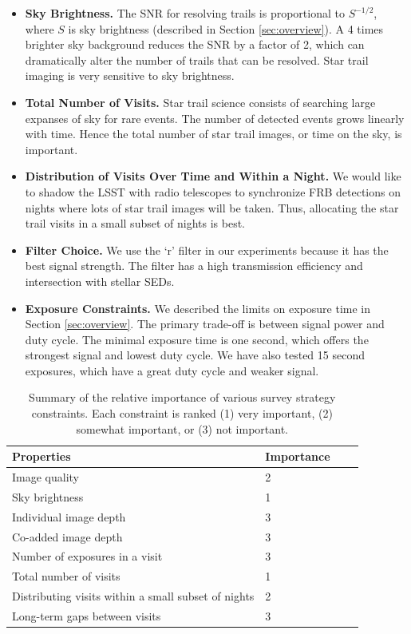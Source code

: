 \documentclass[12pt, letterpaper]{article}
\begin{document}
\begin{itemize}
\item \textbf{Sky Brightness.} The SNR for resolving trails is proportional to $S^{-1/2}$, where $S$ is sky brightness (described in Section \ref{sec:overview}). A 4 times brighter sky background reduces the SNR by a factor of 2, which can dramatically alter the number of trails that can be resolved. Star trail imaging is very sensitive to sky brightness. 

\item \textbf{Total Number of Visits.} Star trail science consists of searching large expanses of sky for rare events. The number of detected events grows linearly with time. Hence the total number of star trail images, or time on the sky, is important.

\item \textbf{Distribution of Visits Over Time and Within a Night.} We would like to shadow the LSST with radio telescopes to synchronize FRB detections on nights where lots of star trail images will be taken. Thus, allocating the star trail visits in a small subset of nights is best. 

\item \textbf{Filter Choice.} We use the `r' filter in our experiments because it has the best signal strength. The filter has a high transmission efficiency and intersection with stellar SEDs.

\item \textbf{Exposure Constraints.} We described the limits on exposure time in Section \ref{sec:overview}. The primary trade-off is between signal power and duty cycle. The minimal exposure time is one second, which offers the strongest signal and lowest duty cycle. We have also tested 15 second exposures, which have a great duty cycle and weaker signal. 
\end{itemize}

\begin{table}[ht]
    \centering
    \begin{tabular}{|l|l|l|l|}
        \hline
        Properties & Importance \hspace{.3in} \\
        \hline
        Image quality & 2\\
        Sky brightness & 1\\
        Individual image depth & 3\\
        Co-added image depth & 3\\
        Number of exposures in a visit & 3\\
        Total number of visits & 1\\
        Distributing visits within a small subset of nights & 2\\
        Long-term gaps between visits & 3\\
        \hline
    \end{tabular}
    \caption{Summary of the relative importance of various survey strategy constraints. Each constraint is ranked (1) very important, (2) somewhat important, or (3) not important.}
        \label{tab:obs_constraints}
\end{table}
\end{document}
